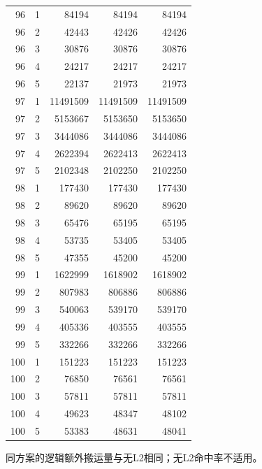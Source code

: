 \begin{longtable}{rrrrr}
96 & 1 & 84194 & 84194 & 84194 \\
96 & 2 & 42443 & 42426 & 42426 \\
96 & 3 & 30876 & 30876 & 30876 \\
96 & 4 & 24217 & 24217 & 24217 \\
96 & 5 & 22137 & 21973 & 21973 \\
97 & 1 & 11491509 & 11491509 & 11491509 \\
97 & 2 & 5153667 & 5153650 & 5153650 \\
97 & 3 & 3444086 & 3444086 & 3444086 \\
97 & 4 & 2622394 & 2622413 & 2622413 \\
97 & 5 & 2102348 & 2102250 & 2102250 \\
98 & 1 & 177430 & 177430 & 177430 \\
98 & 2 & 89620 & 89620 & 89620 \\
98 & 3 & 65476 & 65195 & 65195 \\
98 & 4 & 53735 & 53405 & 53405 \\
98 & 5 & 47355 & 45200 & 45200 \\
99 & 1 & 1622999 & 1618902 & 1618902 \\
99 & 2 & 807983 & 806886 & 806886 \\
99 & 3 & 540063 & 539170 & 539170 \\
99 & 4 & 405336 & 403555 & 403555 \\
99 & 5 & 332266 & 332266 & 332266 \\
100 & 1 & 151223 & 151223 & 151223 \\
100 & 2 & 76850 & 76561 & 76561 \\
100 & 3 & 57811 & 57811 & 57811 \\
100 & 4 & 49623 & 48347 & 48102 \\
100 & 5 & 53383 & 48631 & 48041 \\
\bottomrule
\end{longtable}
同方案的逻辑额外搬运量与无L2相同；无L2命中率不适用。
